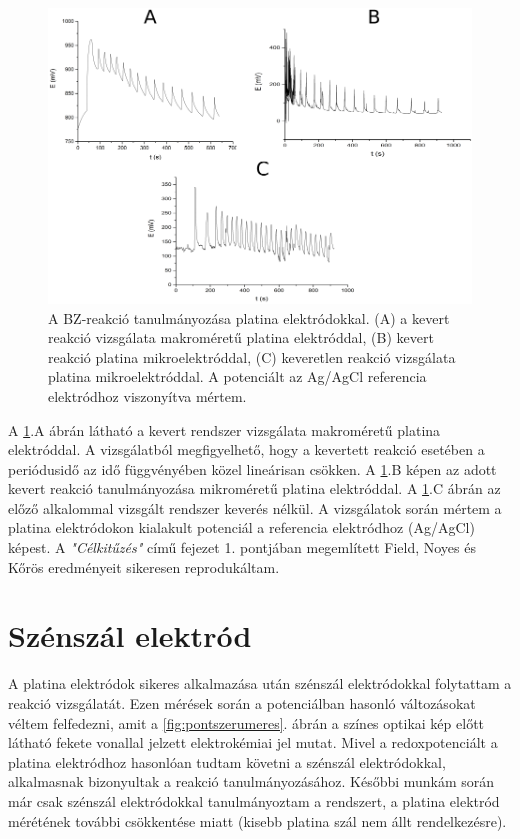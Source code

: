 \begin{figure}[h]
\centering
\includegraphics[width=1\textwidth]{img/platina_meres.png}
\caption{A BZ-reakció tanulmányozása platina elektródokkal. (A) a kevert reakció vizsgálata makroméretű platina elektróddal, (B) kevert reakció platina mikroelektróddal, (C) keveretlen reakció vizsgálata platina mikroelektróddal. A potenciált az Ag/AgCl referencia elektródhoz viszonyítva mértem.}
\label{fig:platina_meres}
\end{figure}
A \ref{fig:platina_meres}.A ábrán látható a kevert rendszer vizsgálata makroméretű platina elektróddal. A vizsgálatból megfigyelhető, hogy a kevertett reakció esetében a periódusidő az idő függvényében közel lineárisan csökken. A \ref{fig:platina_meres}.B képen az adott kevert reakció tanulmányozása mikroméretű platina elektróddal. A \ref{fig:platina_meres}.C ábrán az előző alkalommal vizsgált rendszer keverés nélkül. A vizsgálatok során mértem a platina elektródokon kialakult potenciál a referencia elektródhoz (Ag/AgCl) képest. A \emph{"Célkitűzés"} című fejezet 1. pontjában megemlített Field, Noyes és Kőrös eredményeit \cite{noyes1972oscillations} sikeresen reprodukáltam.  

\section{Szénszál elektród}
A platina elektródok sikeres alkalmazása után szénszál elektródokkal folytattam a reakció vizsgálatát. Ezen mérések során a potenciálban hasonló változásokat véltem felfedezni, amit a \ref{fig:pontszerumeres}. ábrán a színes optikai kép előtt látható fekete vonallal jelzett elektrokémiai jel mutat. Mivel a redoxpotenciált a platina elektródhoz hasonlóan tudtam követni a szénszál elektródokkal, alkalmasnak bizonyultak a reakció tanulmányozásához. Későbbi munkám során már csak szénszál elektródokkal tanulmányoztam a rendszert, a platina elektród mérétének további csökkentése miatt (kisebb platina szál nem állt rendelkezésre).
